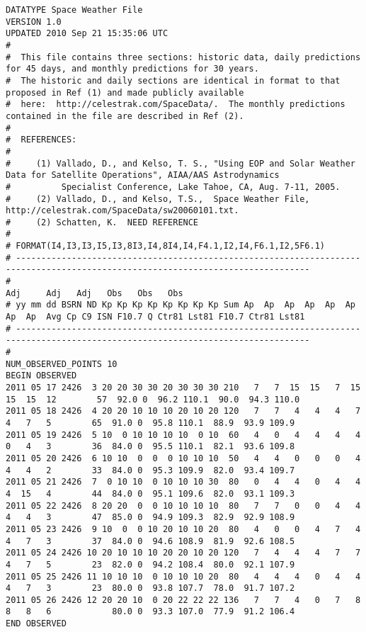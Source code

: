 \begin{landscape}
\begin{small}
\begin{verbatim}
DATATYPE Space Weather File
VERSION 1.0
UPDATED 2010 Sep 21 15:35:06 UTC
#
#  This file contains three sections: historic data, daily predictions for 45 days, and monthly predictions for 30 years.
#  The historic and daily sections are identical in format to that proposed in Ref (1) and made publicly available
#  here:  http://celestrak.com/SpaceData/.  The monthly predictions contained in the file are described in Ref (2).
#
#  REFERENCES:
#
#     (1) Vallado, D., and Kelso, T. S., "Using EOP and Solar Weather Data for Satellite Operations", AIAA/AAS Astrodynamics
#          Specialist Conference, Lake Tahoe, CA, Aug. 7-11, 2005.
#     (2) Vallado, D., and Kelso, T.S.,  Space Weather File, http://celestrak.com/SpaceData/sw20060101.txt.
#     (2) Schatten, K.  NEED REFERENCE
#
# FORMAT(I4,I3,I3,I5,I3,8I3,I4,8I4,I4,F4.1,I2,I4,F6.1,I2,5F6.1)
# --------------------------------------------------------------------------------------------------------------------------------
#                                                                                             Adj     Adj   Adj   Obs   Obs   Obs
# yy mm dd BSRN ND Kp Kp Kp Kp Kp Kp Kp Kp Sum Ap  Ap  Ap  Ap  Ap  Ap  Ap  Ap  Avg Cp C9 ISN F10.7 Q Ctr81 Lst81 F10.7 Ctr81 Lst81
# --------------------------------------------------------------------------------------------------------------------------------
#
NUM_OBSERVED_POINTS 10
BEGIN OBSERVED
2011 05 17 2426  3 20 20 30 30 20 30 30 30 210   7   7  15  15   7  15  15  15  12        57  92.0 0  96.2 110.1  90.0  94.3 110.0
2011 05 18 2426  4 20 20 10 10 10 20 10 20 120   7   7   4   4   4   7   4   7   5        65  91.0 0  95.8 110.1  88.9  93.9 109.9
2011 05 19 2426  5 10  0 10 10 10 10  0 10  60   4   0   4   4   4   4   0   4   3        36  84.0 0  95.5 110.1  82.1  93.6 109.8
2011 05 20 2426  6 10 10  0  0  0 10 10 10  50   4   4   0   0   0   4   4   4   2        33  84.0 0  95.3 109.9  82.0  93.4 109.7
2011 05 21 2426  7  0 10 10  0 10 10 10 30  80   0   4   4   0   4   4   4  15   4        44  84.0 0  95.1 109.6  82.0  93.1 109.3
2011 05 22 2426  8 20 20  0  0 10 10 10 10  80   7   7   0   0   4   4   4   4   3        47  85.0 0  94.9 109.3  82.9  92.9 108.9
2011 05 23 2426  9 10  0  0 10 20 10 10 20  80   4   0   0   4   7   4   4   7   3        37  84.0 0  94.6 108.9  81.9  92.6 108.5
2011 05 24 2426 10 20 10 10 10 20 20 10 20 120   7   4   4   4   7   7   4   7   5        23  82.0 0  94.2 108.4  80.0  92.1 107.9
2011 05 25 2426 11 10 10 10  0 10 10 10 20  80   4   4   4   0   4   4   4   7   3        23  80.0 0  93.8 107.7  78.0  91.7 107.2
2011 05 26 2426 12 20 20 10  0 20 22 22 22 136   7   7   4   0   7   8   8   8   6            80.0 0  93.3 107.0  77.9  91.2 106.4
END OBSERVED


\end{verbatim}
\end{small}
\end{landscape}
